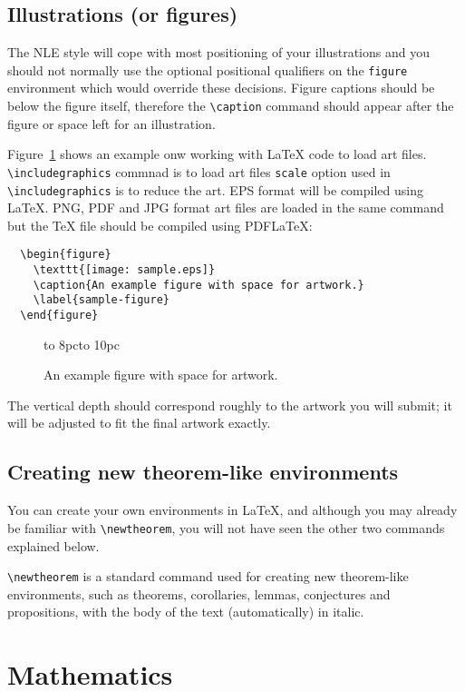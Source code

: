 \documentclass{nle}
\begin{document}
\subsection{Illustrations (or figures)}

The NLE style will cope with most positioning of your illustrations
and you should not normally use the optional positional qualifiers on
the \verb"figure" environment which would override these decisions.
Figure captions should be below the figure itself, therefore the \verb"\caption"
command should appear after the figure or space left for an illustration.

Figure~\ref{sample-figure} shows an example onw working with LaTeX code to load art files. \verb"\includegraphics" commnad is to load art files \verb"scale" option used in \verb"\includegraphics" is to reduce the art. EPS format will be compiled using LaTeX. PNG, PDF and JPG format art files are loaded in the same command but the TeX file should be compiled using PDFLaTeX:
%
\begin{verbatim}
  \begin{figure}
    \texttt{[image: sample.eps]}
    \caption{An example figure with space for artwork.}
    \label{sample-figure}
  \end{figure}
\end{verbatim}
%
\begin{figure}[t]
  \centerline{\vbox to 8pc{\hbox to 10pc{}}}
  \caption{An example figure with space for artwork.}
  \label{sample-figure}
\end{figure}
%
The vertical depth should correspond roughly to the artwork you will submit;
it will be adjusted to fit the final artwork exactly.

\subsection{Creating new theorem-like environments}

You can create your own environments in \LaTeX, and although you may already
be familiar with \verb"\newtheorem", you will not have seen the other two
commands explained below.

\verb"\newtheorem" is a standard command used for creating new
        theorem-like environments, such as theorems, corollaries, lemmas,
        conjectures and propositions, with the body of the text
        (automatically) in italic.

\section{Mathematics}
\end{document}
